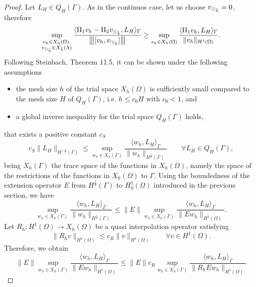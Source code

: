 \begin{proof}
Let $L_H \in Q_H(\Gamma)$. As in the continuos case, let us choose $v_{\odot_{\tilde{h}}} =0$, therefore 
\begin{equation*}
\sup_{\substack{v_h \in X_h(\Omega),\\ v_{\odot_{\tilde{h}}} \in X_{\tilde{h}}(\Lambda)}} \frac{ \langle \Pi_1 v_h - \Pi_2 v_{\odot_{\tilde{h}}}, L_H \rangle _{\Gamma}} {{\left\vert\kern-0.25ex\left\vert\kern-0.25ex\left\vert [v_h, v_{\odot_{\tilde{h}}}] \right\vert\kern-0.25ex\right\vert\kern-0.25ex\right\vert}}
\geq \sup_{v_h \in X_h(\Omega)} \frac{ \langle \Pi_1 v_h, L_H \rangle _{\Gamma} } {\|v_h\|_{H^1(\Omega)}}.
\end{equation*}
Following Steinbach, Theorem 11.5, it can be shown under the following assumptions 
\begin{itemize}
\item the mesh size $h$ of the trial space $X_h(\Omega)$ is sufficiently small compared to the mesh size $H$ of $Q_H(\Gamma)$, i.e. $h \leq c_0 H$ with $c_0 < 1$, and
\item a global inverse inequality for the trial space $Q_H(\Gamma)$ holds,
\end{itemize}
that exists a positive constant $c_S$
\begin{equation}\label{infsup_tracespace}
c_S \|L_H\|_{H^{-\frac 12}(\Gamma)} \leq 
\sup_{w_h \in X_h(\Gamma)} \frac{ \langle w_h, L_H \rangle _{\Gamma} } {\|w_h\|_{H^{\frac 12}(\Gamma)}} \qquad \forall L_H \in Q_H(\Gamma),
\end{equation}
being $X_h(\Gamma)$ the trace space of the functions in $X_h(\Omega)$, namely the space of the restrictions of the functions in $X_h(\Omega)$ to $\Gamma$. 
Using the boundedness of the extension operator $E$ from $H^{\frac 12}(\Gamma)$ to $H^1_0(\Omega)$ introduced in the previous section, we have
\begin{equation*}
\sup_{w_h \in X_h(\Gamma)} \frac{ \langle w_h, L_H \rangle _{\Gamma} } {\|w_h\|_{H^{\frac 12}(\Gamma)}} 
\leq 
\|E\| \sup_{w_h \in X_h(\Gamma)} \frac{ \langle w_h, L_H \rangle _{\Gamma} } {\|E w_h\|_{H^1(\Omega)}}.
\end{equation*}
Let $R_h: H^1(\Omega) \rightarrow X_h(\Omega)$ be a quasi interpolation operator satisfying 
\begin{equation*}
\|R_h v\|_{H^1(\Omega)} \leq c_R \|v\|_{H^1(\Omega)} \qquad \forall v \in H^1(\Omega).
\end{equation*}
Therefore, we obtain 
\begin{equation*}
\|E\| \sup_{w_h \in X_h(\Gamma)} \frac{ \langle w_h, L_H \rangle _{\Gamma} } {\|E w_h\|_{H^1(\Omega)}}
\leq
\|E\| c_R \sup_{w_h \in X_h(\Gamma)} \frac{ \langle w_h, L_H \rangle_{\Gamma} } {\|R_hE w_h\|_{H^1(\Omega)}}

\end{equation*}
\end{proof}
